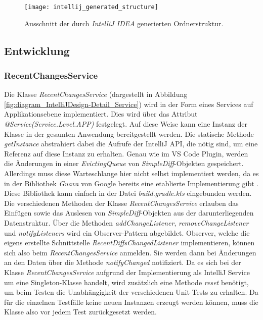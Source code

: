 \begin{figure}
    \centering
    \texttt{[image: intellij\_generated\_structure]}
    \caption{Ausschnitt der durch \emph{IntelliJ IDEA} generierten Ordnerstruktur.}
    \label{fig:intellij_generated_structure}
\end{figure}   

\subsection{Entwicklung}

\subsubsection{RecentChangesService}

Die Klasse \emph{RecentChangesService} (dargestellt in
Abbildung \ref{fig:diagram_IntelliJDesign-Detail_Service}) 
wird in der Form eines
Services auf Applikationsebene implementiert. Dies wird 
über das Attribut \emph{@Service(Service.Level.APP)} festgelegt. 
Auf diese Weise kann eine Instanz der Klasse in der gesamten Anwendung
bereitgestellt werden. Die statische Methode \emph{getInstance}
abstrahiert dabei die Aufrufe der IntelliJ API, die nötig sind, um eine
Referenz auf diese Instanz zu erhalten. Genau wie im VS Code Plugin,
werden die Änderungen in einer \emph{EvictingQueue} von 
\emph{SimpleDiff}-Objekten gespeichert. Allerdings muss diese
Warteschlange hier nicht selbst implementiert werden, da es in
der Bibliothek \emph{Guava} von Google bereits eine etablierte 
Implementierung gibt \cite{GuavaGitHub}.
Diese Bibliothek kann einfach
in der Datei \emph{build.gradle.kts} eingebunden werden.
Die verschiedenen Methoden der Klasse \emph{RecentChangesService} erlauben
das Einfügen sowie das Auslesen von \emph{SimpleDiff}-Objekten aus
der darunterliegenden Datenstruktur. Über die Methoden \emph{addChangeListener},
\emph{removeChangeListener} und \emph{notifyListeners} wird ein Observer-Pattern
abgebildet. Observer, welche die eigens erstellte Schnittstelle 
\emph{RecentDiffsChangedListener} implementieren, können sich also
beim \emph{RecentChangesService} anmelden. Sie werden dann bei Änderungen 
an den Daten über die Methode \emph{notifyChanged} notifiziert.
Da es sich bei der Klasse \emph{RecentChangesService} aufgrund der Implementierung
als IntelliJ Service um eine Singleton-Klasse \cite{2005Dp:e}
handelt, wird zusätzlich eine Methode \emph{reset} benötigt, um beim Testen
die Unabhängigkeit der verschiedenen Unit-Tests zu erhalten. Da für
die einzelnen Testfälle keine neuen Instanzen erzeugt werden können, muss
die Klasse also vor jedem Test zurückgesetzt werden.

